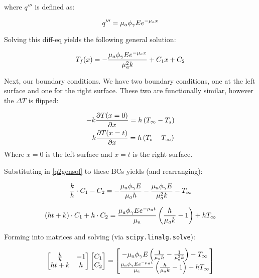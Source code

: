 \documentclass{article}
\begin{document}
where $q'''$ is defined as:

\begin{equation}
    q''' = \mu_a \phi_{\gamma} E e^{-\mu_a x}
\end{equation}

Solving this diff-eq yields the following general solution:

\begin{equation}
    T_f(x) = -\frac{\mu_a \phi_{\gamma} E e^{-\mu_a x}}{\mu_a^2 k } + C_1x + C_2
    \label{q2gensol}
\end{equation}

Next, our boundary conditions. We have two boundary conditions, one at the left surface and one for the right surface. These two are functionally similar, however the $\Delta T$ is flipped:

\begin{equation}
\begin{gathered}
    -k \frac{\partial T(x = 0)}{\partial x} = h \left( T_{\infty} - T_s\right)\\ 
    -k \frac{\partial T(x=t)}{\partial x} = h \left(T_s - T_{\infty}\right)
\end{gathered}
\end{equation}
Where $x=0$ is the left surface and $x=t$ is the right surface.

Substituting in \eqref{q2gensol} to these BCs yields (and rearranging):

\begin{equation}
    \frac{k}{h} \cdot C_1 - C_2 = -\frac{\mu_a \phi_{\gamma} E}{\mu_a h} - \frac{\mu_a \phi_{\gamma} E}{\mu_a^2 k} - T_{\infty}
\end{equation}

\begin{equation}
    \left( h t + k \right) \cdot C_1+ h \cdot C_2 = \frac{\mu_a \phi_{\gamma} E e^{-\mu_a t}}{\mu_a} \left( \frac{h}{\mu_a k} - 1\right) + h T_{\infty}
\end{equation}

Forming into matrices and solving (via \texttt{scipy.linalg.solve}):

\begin{equation}
    \begin{bmatrix}
    \frac{k}{h} & -1 \\
    h t + k & h
    \end{bmatrix} 
    \begin{bmatrix}
        C_1 \\
        C_2
    \end{bmatrix}
    =
    \begin{bmatrix}
        -\mu_a \phi_{\gamma} E\left(\frac{1}{\mu_a h} - \frac{1}{\mu_a^2 k}\right) - T_{\infty} \\
        \frac{\mu_a \phi_{\gamma} E e^{-\mu_a t}}{\mu_a} \left( \frac{h}{\mu_a k} - 1\right) + h T_{\infty}
    \end{bmatrix}
\end{equation}
\end{document}
